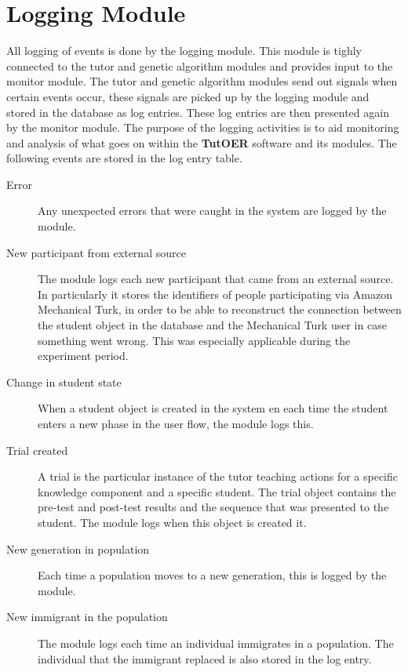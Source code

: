 \section{Logging Module}
\label{sec:software_logging_module}
All logging of events is done by the logging module. This module is tighly
connected to the tutor and genetic algorithm modules and provides input to
the monitor module. The tutor and genetic algorithm modules send out signals
when certain events occur, these signals are picked up by the logging module
and stored in the database as log entries. These log entries are then presented
again by the monitor module. The purpose of the logging activities is to aid
monitoring and analysis of what goes on within the \textbf{TutOER} software and its
modules. The following events are stored in the log entry table.
\begin{leftbar}
\begin{description}
	\item[Error] Any unexpected errors that were caught in the system are
		logged by the module.
	\item[New participant from external source] The module logs each new
		participant that came from an external source. In particularly it
		stores the identifiers of people participating via Amazon
		Mechanical Turk, in order to be able to reconstruct the connection
		between the student object in the database and the Mechanical Turk
		user in case something went wrong. This was especially applicable
		during the experiment period.
	\item[Change in student state] When a student object is created in the
		system en each time the student enters a new phase in the user
		flow, the module logs this.
	\item[Trial created] A trial is the particular instance of the tutor
		teaching actions for a specific knowledge component and a specific
		student. The trial object contains the pre-test and post-test
		results and the sequence that was presented to the student. The
		module logs when this object is created it.
	\item[New generation in population] Each time a population moves to a
		new generation, this is logged by the module.
	\item[New immigrant in the population] The module logs each time an
		individual immigrates in a population. The individual that the
		immigrant replaced is also stored in the log entry.
\end{description}
\end{leftbar}
